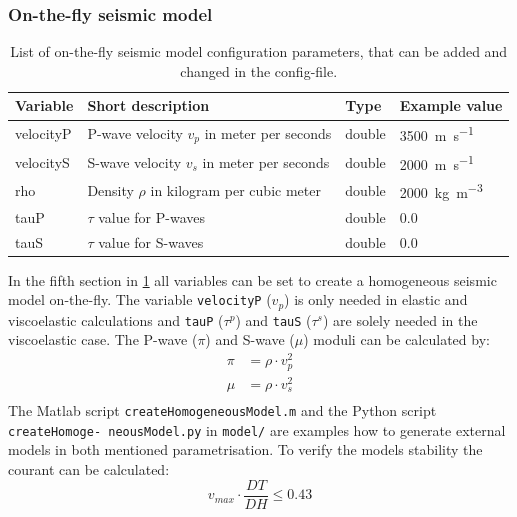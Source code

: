 \documentclass[pdftex,a4paper,parskip,listof=totoc,bibliography=totoc,onehalfspacing,12pt]{scrreprt}
\newcommand{\shellcmd}[1]{\indent\indent\texttt{#1}}	%
\begin{document}
\subsubsection{On-the-fly seismic model}
\begin{table}[h!]
\caption[List of on-the-fly seismic model configuration parameters.]{List of on-the-fly seismic model configuration parameters, that can be added and changed in the config-file.}\label{tab:config_onthefly}
\centering
\begin{adjustbox}{width=0.8\textwidth,center=\textwidth}
	\begin{tabular}{llll}
	\toprule
	Variable & Short description & Type & Example value \\
	\midrule
	velocityP & P-wave velocity $v_p$ in meter per seconds & double & \SI{3500}{m\per s} \\
	velocityS& S-wave velocity $v_s$ in meter per seconds & double  & \SI{2000}{m\per s}\\
	rho& Density $\rho$ in kilogram per cubic meter & double &  \SI{2000}{kg\per\cubic\metre}\\
	tauP& $\tau$ value for P-waves & double & \num{0.0}\\
	tauS& $\tau$ value for S-waves & double & \num{0.0}\\
	\bottomrule
	\end{tabular}
	\end{adjustbox}
\end{table}
In the fifth section in \ref{tab:config_onthefly} all variables can be set to create a homogeneous seismic model on-the-fly. The variable \verb+velocityP+ ($v_p$) is only needed in elastic and viscoelastic calculations and  \verb+tauP+ ($\tau^p$) and \verb+tauS+ ($\tau^s$) are solely needed in the viscoelastic case. 
The P-wave ($\pi$) and S-wave ($\mu$) moduli can be calculated by:
\begin{align*}
	\pi&=\rho\cdot v_p^2\\
	\mu &=\rho\cdot v_s^2\\
\end{align*}
The Matlab script \shellcmd{createHomogeneousModel.m} and the Python script \shellcmd{createHomoge- neousModel.py} in \shellcmd{model/} are examples how to generate external models in both mentioned parametrisation. 
To verify the models stability  the courant can be calculated: 
\begin{equation*}
	v_{max} \cdot \frac{DT}{DH} \leq 0.43
\end{equation*}
\end{document}
